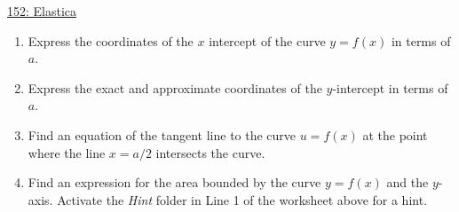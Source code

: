 \documentclass{ximera}
\begin{document}
\begin{question} \label{QKDFeefrfr3}

\begin{onlineOnly}
    \begin{center}
\end{center}
\end{onlineOnly}

\href{https://www.desmos.com/calculator/c3vderglut}{152: Elastica}

\begin{enumerate}

\item Express the coordinates of the $x$ intercept of the curve $y=f(x)$ in terms of $a$.

\item Express the exact and approximate coordinates of the $y$-intercept in terms of $a$.

\item Find an equation of the tangent line to the curve $u=f(x)$ at the point where the line $x=a/2$ intersects the curve.

\item Find an expression for the area bounded by the curve $y=f(x)$ and the $y$-axis. Activate the \emph{Hint} folder in Line 1 of the worksheet above for a hint. 

\end{enumerate}

\end{question}
\end{document}
